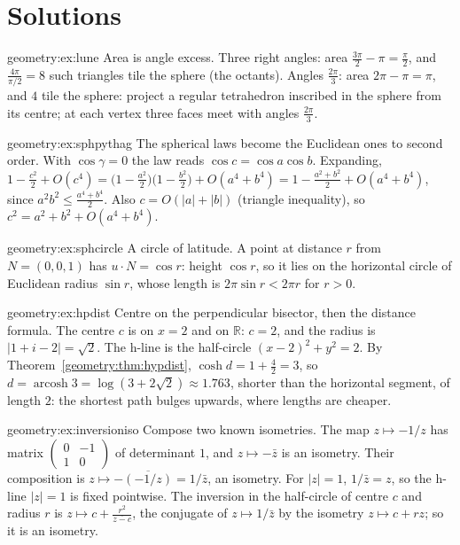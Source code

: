 \section{Solutions}

\begin{solution}{geometry:ex:lune}
\idea Area is angle excess.
\writeup Three right angles: area $\frac{3\pi}2-\pi=\frac\pi2$, and $\frac{4\pi}{\pi/2}=8$ such triangles tile the sphere (the octants). Angles $\frac{2\pi}3$:
area $2\pi-\pi=\pi$, and $4$ tile the sphere: project a regular tetrahedron inscribed in the sphere from its centre; at each vertex three faces meet with
angles $\frac{2\pi}3$.
\end{solution}

\begin{solution}{geometry:ex:sphpythag}
\idea The spherical laws become the Euclidean ones to second order.
\writeup With $\cos\gamma=0$ the law reads $\cos c=\cos a\cos b$. Expanding, $1-\frac{c^2}2+O(c^4)=\bigl(1-\frac{a^2}2\bigr)\bigl(1-\frac{b^2}2\bigr)+O(a^4+b^4)=
1-\frac{a^2+b^2}2+O(a^4+b^4)$, since $a^2b^2\le\frac{a^4+b^4}2$. Also $c=O(|a|+|b|)$ (triangle inequality), so $c^2=a^2+b^2+O(a^4+b^4)$.
\end{solution}

\begin{solution}{geometry:ex:sphcircle}
\idea A circle of latitude.
\writeup A point at distance $r$ from $N=(0,0,1)$ has $u\cdot N=\cos r$: height $\cos r$, so it lies on the horizontal circle of Euclidean radius $\sin r$,
whose length is $2\pi\sin r<2\pi r$ for $r>0$.
\end{solution}

\begin{solution}{geometry:ex:hpdist}
\idea Centre on the perpendicular bisector, then the distance formula.
\writeup The centre $c$ is on $x=2$ and on $\mathbb R$: $c=2$, and the radius is $|1+i-2|=\sqrt2$. The h-line is the half-circle $(x-2)^2+y^2=2$. By
Theorem~\ref{geometry:thm:hypdist}, $\cosh d=1+\frac{4}{2}=3$, so $d=\operatorname{arcosh}3=\log(3+2\sqrt2)\approx1.763$, shorter than the horizontal segment, of
length $2$: the shortest path bulges upwards, where lengths are cheaper.
\end{solution}

\begin{solution}{geometry:ex:inversioniso}
\idea Compose two known isometries.
\writeup The map $z\mapsto-1/z$ has matrix $\begin{pmatrix}0&-1\\1&0\end{pmatrix}$ of determinant $1$, and $z\mapsto-\bar z$ is an isometry. Their composition is
$z\mapsto-\overline{(-1/z)}=1/\bar z$, an isometry. For $|z|=1$, $1/\bar z=z$, so the h-line $|z|=1$ is fixed pointwise. The inversion in the half-circle of centre
$c$ and radius $r$ is $z\mapsto c+\frac{r^2}{\overline{z-c}}$, the conjugate of $z\mapsto1/\bar z$ by the isometry $z\mapsto c+rz$; so it is an isometry.
\end{solution}


